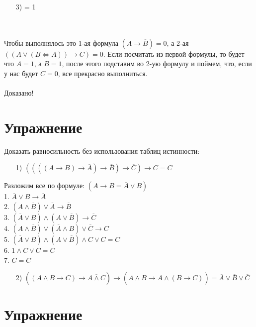\documentclass{article}
\begin{document}
\begin{enumerate}
\item[3)]  \rightarrow {} = 1
\end{enumerate} \\
\\
Чтобы выполнялось это 1-ая формула $(A \rightarrow \overline{B}) = 0$, а 2-ая $((A \vee (B \Longleftrightarrow A)) \rightarrow C) = 0$. Если посчитать из первой формулы, то будет что $A = 1$, а $B = 1$, после этого подставим во 2-ую формулу и поймем, что, если у нас будет $C = 0$, все прекрасно выполниться.
\\
\\
Доказано!

\section{Упражнение}

Доказать равносильность без использования таблиц истинности:
\begin{enumerate}
\item[1)] $((((A \rightarrow B) \rightarrow \overline{A}) \rightarrow \overline{B}) \rightarrow \overline{C}) \rightarrow C = C$
\end{enumerate}
Разложим все по формуле: $(A \rightarrow B = \overline{A} \vee B)$\\
1. $\overline{A} \vee B \rightarrow \overline{A}$ \\
2. $(A \wedge \overline{B}) \vee \overline{A} \rightarrow \overline{B}$\\
3. $(\overline{A} \vee B) \wedge (A \vee \overline{B}) \rightarrow \overline{C}$\\
4. $(A \wedge \overline{B}) \vee (\overline{A} \wedge B) \vee \overline{C} \rightarrow C$\\
5. $(\overline{A} \vee B) \wedge (A \vee \overline{B}) \wedge C \vee C = C$\\
6. $1 \wedge C \vee C = C$\\
7. $C = C$

\begin{enumerate}
\item[2)] $(\overline{(A \wedge B \rightarrow C)} \rightarrow \overline{A \wedge C}) \rightarrow (A \wedge B \rightarrow \overline{A \wedge (B \rightarrow C )}) = \overline{A} \vee \overline{B} \vee \overline{C}$
\end{enumerate}

\section{Упражнение}
\end{document}
